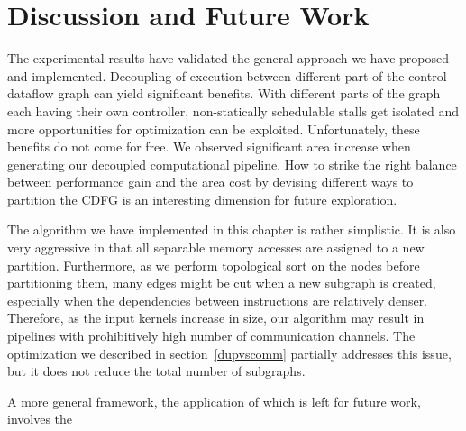 \section{Discussion and Future Work}
The experimental results have validated the general approach we have proposed and implemented. 
Decoupling of execution between different part of the control dataflow graph can yield
significant benefits. With different parts of the graph each having their own controller, non-statically schedulable stalls get isolated and more opportunities for
optimization can be exploited. Unfortunately, these benefits do not come for free. We observed significant area increase when generating our decoupled computational pipeline.
How to strike the right balance between performance gain and the area cost by devising different ways to partition the CDFG is an interesting dimension for future exploration.

The algorithm we have implemented in this chapter is rather simplistic. 
It is also very aggressive in that all separable memory accesses are assigned to a new partition.
Furthermore, as we perform topological sort on the nodes before partitioning them, many
edges might be cut when a new subgraph is created, especially when the dependencies between instructions are relatively denser.
Therefore, as the input kernels increase in size, our algorithm may result in pipelines with prohibitively high number of communication channels. The optimization we described in section~\ref{dupvscomm}
partially addresses this issue, but it does not reduce the total number of subgraphs.

A more general framework, the application of which is left for future work, involves the

